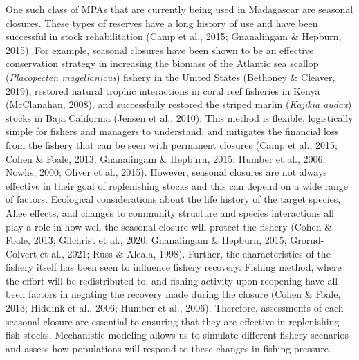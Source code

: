 \documentclass[
]{article}
\begin{document}
One such class of MPAs that are currently being used in Madagascar are seasonal closures. These types of reserves have a long history of use and have been successful in stock rehabilitation (Camp et al., 2015; Gnanalingam \& Hepburn, 2015). For example, seasonal closures have been shown to be an effective conservation strategy in increasing the biomass of the Atlantic sea scallop (\emph{Placopecten magellanicus}) fishery in the United States (Bethoney \& Cleaver, 2019), restored natural trophic interactions in coral reef fisheries in Kenya (McClanahan, 2008), and successfully restored the striped marlin (\emph{Kajikia audax}) stocks in Baja California (Jensen et al., 2010). This method is flexible, logistically simple for fishers and managers to understand, and mitigates the financial loss from the fishery that can be seen with permanent closures (Camp et al., 2015; Cohen \& Foale, 2013; Gnanalingam \& Hepburn, 2015; Humber et al., 2006; Nowlis, 2000; Oliver et al., 2015). However, seasonal closures are not always effective in their goal of replenishing stocks and this can depend on a wide range of factors. Ecological considerations about the life history of the target species, Allee effects, and changes to community structure and species interactions all play a role in how well the seasonal closure will protect the fishery (Cohen \& Foale, 2013; Gilchrist et al., 2020; Gnanalingam \& Hepburn, 2015; Grorud-Colvert et al., 2021; Russ \& Alcala, 1998). Further, the characteristics of the fishery itself has been seen to influence fishery recovery. Fishing method, where the effort will be redistributed to, and fishing activity upon reopening have all been factors in negating the recovery made during the closure (Cohen \& Foale, 2013; Hiddink et al., 2006; Humber et al., 2006). Therefore, assessments of each seasonal closure are essential to ensuring that they are effective in replenishing fish stocks. Mechanistic modeling allows us to simulate different fishery scenarios and assess how populations will respond to these changes in fishing pressure.
\end{document}
